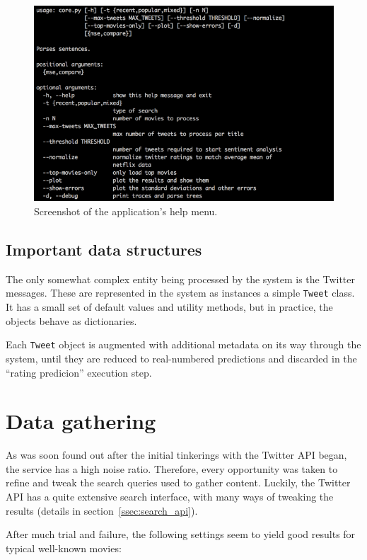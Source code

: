 \begin{figure}[h]
  \centering
    \includegraphics[width=.9\textwidth]{Figures/tool_help}
  \caption{Screenshot of the application's help menu.}
  \label{fig:tool_help}
\end{figure}

\subsection{Important data structures} %
\label{sub:data_structures}

The only somewhat complex entity being processed by the system is the Twitter messages. These are represented in the system as instances a simple \verb+Tweet+ class. It has a small set of default values and utility methods, but in practice, the objects behave as dictionaries.

Each \verb+Tweet+ object is augmented with additional metadata on its way through the system, until they are reduced to real-numbered predictions and discarded in the ``rating predicion'' execution step.

\section{Data gathering} %
\label{sec:data_gathering_impl}

As was soon found out after the initial tinkerings with the Twitter API began, the service has a high noise ratio. Therefore, every opportunity was taken to refine and tweak the search queries used to gather content. Luckily, the Twitter API has a quite extensive search interface, with many ways of tweaking the results (details in section~\ref{ssec:search_api}).

After much trial and failure, the following settings seem to yield good results for typical well-known movies:

